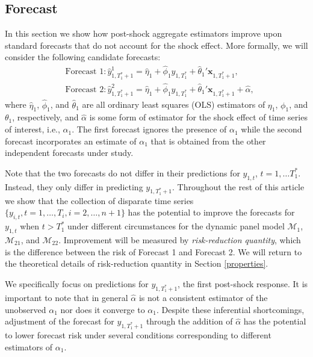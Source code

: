 \documentclass[11pt]{article}
\newcommand{\x}{\textbf{x}}
\def\mc#1{\mathcal{#1}} %
\def\E#1{\mathrm{E}(#1)} %
\theoremstyle{definition}
\begin{document}
\subsection{Forecast}
\label{forecast}
In this section we show how post-shock aggregate estimators improve upon standard 
forecasts that do not account for the shock effect.
More formally, we will consider the following candidate forecasts: 
\begin{align*}
  &\text{Forecast 1}: \hat y_{1,T_1^*+1}^1 = \hat\eta_1 
    + \hat\phi_1 y_{1,T_1^*} + \hat\theta_1'\x_{1,T_1^*+1} 
    , \\
  &\text{Forecast 2}: \hat y_{1,T_1^*+1}^2 = \hat\eta_1 
    + \hat\phi_1 y_{1,T_1^*} + \hat\theta_1'\x_{1,T_1^*+1} 
    + \hat{\alpha},
\end{align*}
where $\hat\eta_1$, $\hat\phi_1$, and $\hat\theta_1$ are all ordinary least squares (OLS) estimators of $\eta_1$, $\phi_1$, and $\theta_1$, respectively, and $\hat{\alpha}$ is some form of estimator for the shock effect of time series of interest, i.e., $\alpha_1$. 
The first forecast ignores the presence of $\alpha_1$ while the second forecast 
incorporates an estimate of $\alpha_1$ that is obtained from the other independent forecasts under study. 

Note that the two forecasts do not differ in their predictions for 
$y_{1,t}$, $t = 1,\ldots T_1^*$. Instead, they only differ in predicting 
$y_{1,T_1^*+1}$. Throughout the rest of this article we show that the collection of 
disparate time series $\{y_{i,t}, t = 1,\ldots,T_i, i = 2,\ldots,n+1\}$ has 
the potential to improve the forecasts for $y_{1, t}$ when $t > T_1^*$ under different 
circumstances for the dynamic panel model $\mc{M}_1$, $\mc{M}_{21}$, and $\mc{M}_{22}$. Improvement will be  measured by \emph{risk-reduction quantity}, which is the difference between the risk of Forecast 1 and Forecast 2. We will return to the theoretical details of risk-reduction quantity in Section \ref{properties}.

We specifically focus on predictions for $y_{1,T_1^*+1}$, the first post-shock response. It is important to note that in general $\hat{\alpha}$ 
is not a consistent estimator of the unobserved $\alpha_1$ nor does it converge 
to $\alpha_1$.  Despite these inferential shortcomings, adjustment of the forecast 
for $y_{1,T_1^*+1}$ through the addition of $\hat{\alpha}$ has 
the potential to lower forecast risk under several conditions corresponding to 
different estimators of $\alpha_1$. %
\end{document}
